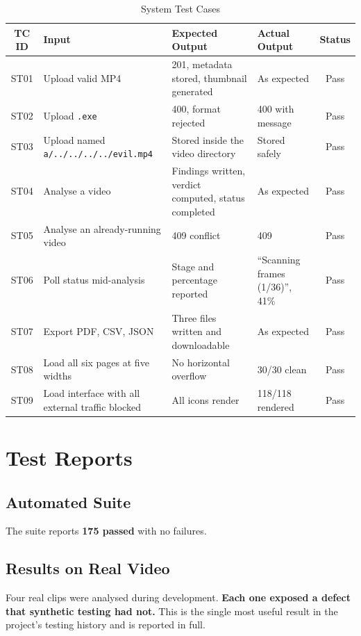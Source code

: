 \documentclass[
12pt,
a4paper,
oneside
]{report}
\begin{document}
\begin{table}[H]
\centering
\small
\begin{tabular}{|c|p{3cm}|p{3.4cm}|p{3.4cm}|c|}
\hline
\textbf{TC ID} & \textbf{Input} & \textbf{Expected Output} &
\textbf{Actual Output} & \textbf{Status} \\
\hline
ST01 & Upload valid MP4 & 201, metadata stored, thumbnail generated & As
expected & Pass \\
\hline
ST02 & Upload \texttt{.exe} & 400, format rejected & 400 with message & Pass \\
\hline
ST03 & Upload named \texttt{a/../../../../evil.mp4} & Stored inside the video
directory & Stored safely & Pass \\
\hline
ST04 & Analyse a video & Findings written, verdict computed, status completed &
As expected & Pass \\
\hline
ST05 & Analyse an already-running video & 409 conflict & 409 & Pass \\
\hline
ST06 & Poll status mid-analysis & Stage and percentage reported & ``Scanning
frames (1/36)'', 41\% & Pass \\
\hline
ST07 & Export PDF, CSV, JSON & Three files written and downloadable & As
expected & Pass \\
\hline
ST08 & Load all six pages at five widths & No horizontal overflow & 30/30 clean
& Pass \\
\hline
ST09 & Load interface with all external traffic blocked & All icons render &
118/118 rendered & Pass \\
\hline
\end{tabular}
\caption{System Test Cases}
\end{table}

\section{Test Reports}

\subsection{Automated Suite}

The suite reports \textbf{175 passed} with no failures.

\subsection{Results on Real Video}

Four real clips were analysed during development. \textbf{Each one exposed a
defect that synthetic testing had not.} This is the single most useful result in
the project's testing history and is reported in full.
\end{document}
